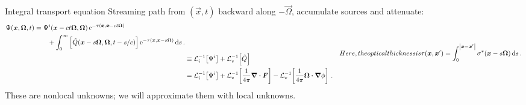 \documentclass{beamer}
\begin{document}
\begin{frame}{Integral transport equation}
  Streaming path from $(\vec{x}, t)$ backward along $-\vec{\Omega}$, accumulate
  sources and attenuate:
\begin{subequations} \label{eqs:inverseTransport}
  \begin{align} \label{eq:inverseTransportFull}
  \begin{split}
    \Psi(\vec{x}, \vec{\Omega}, t)
    &=
    \Psi^i( \vec{x} - ct \vec{\Omega}, \vec{\Omega})
    \eexp^{ -\tau(\vec{x}, \vec{x} - ct \vec{\Omega})}
    \\
    &\qquad + \int_{0}^{\infty}
    \left[ \hat Q(\vec{x} - s \vec{\Omega}, \vec{\Omega}, t-s/c)
    \right]
    \eexp^{ -\tau(\vec{x}, \vec{x} - s \vec{\Omega})}
    \ud s\,.
  \end{split}
    \\ 
    &\equiv  \lopinv{i}{\Psi^i}
    + \lopinv{v}{\hat Q}
    \\ \nonumber
    &= \lopinv{i}{\Psi^i}
  + \lopinv{v}{\frac{1}{4\pi} \grad \vd\vec{F}} -
  \lopinv{v}{\frac{1}{4\pi} \vec{\Omega}\vd \grad \phi} \,.
  \end{align}
  Here, the optical thickness is 
  \begin{equation} \label{eq:fullTauDefinition}
    \tau(\vec{x}, \vec{x}') = \int_{0}^{\abs{\vec{x} -
    \vec{x}'}} \sigma^\ast(\vec{x}-s\vec{\Omega}) \ud s \,.
  \end{equation}
\end{subequations}
These are nonlocal unknowns; we will approximate them with local unknowns.
\end{frame}
\end{document}
